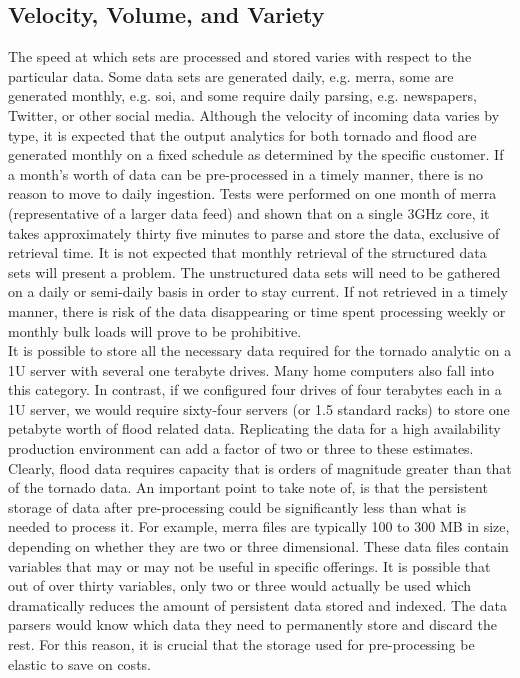 \subsection{Velocity, Volume, and Variety}
The speed at which sets are processed and stored varies with respect to the particular data. Some data sets are generated daily, e.g. \gls{merra}, some are generated monthly, e.g. \gls{soi}, and some require daily parsing, e.g. newspapers, Twitter, or other social media. Although the velocity of incoming data varies by type, it is expected that the output analytics for both tornado and flood are generated monthly on a fixed schedule as determined by the specific customer. If a month's worth of data can be pre-processed in a timely manner, there is no reason to move to daily ingestion. Tests were performed on one month of  \gls{merra} (representative of a larger data feed) and shown that on a single 3GHz core, it takes approximately thirty five minutes to parse and store the data, exclusive of retrieval time. It is not expected that monthly retrieval of the structured data sets will present a problem. The unstructured data sets will need to be gathered on a daily or semi-daily basis in order to stay current. If not retrieved in a timely manner, there is risk of the data disappearing or time spent processing weekly or monthly bulk loads will prove to be prohibitive.\\

It is possible to store all the necessary data required for the tornado analytic on a 1U server with several one terabyte drives. Many home computers also fall into this category. In contrast, if we configured four drives of four terabytes each in a 1U server, we would require sixty-four servers  (or 1.5 standard racks) to store one petabyte worth of flood related data. Replicating the data for a high availability production environment can add a factor of two or three to these estimates. Clearly, flood data requires capacity that is orders of magnitude greater than that of the tornado data. An important point to take note of, is that the persistent storage of data after pre-processing could be significantly less than what is needed to process it. For example, \gls{merra} files are typically 100 to 300 MB in size, depending on whether they are two or three dimensional. These data files contain variables that may or may not be useful in specific offerings. It is possible that out of over thirty variables, only two or three would actually be used which dramatically reduces the amount of persistent data stored and indexed. The data parsers would know which data they need to permanently store and discard the rest. For this reason, it is crucial that the storage used for pre-processing be elastic to save on costs.\\

